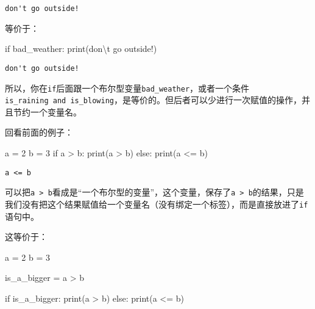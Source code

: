 \documentclass[
  letterpaper,
  DIV=11,
  numbers=noendperiod]{scrreprt}
\newenvironment{Shaded}{\begin{snugshade}}{\end{snugshade}}
\newcommand{\BuiltInTok}[1]{\textcolor[rgb]{0.00,0.23,0.31}{#1}}
\newcommand{\CharTok}[1]{\textcolor[rgb]{0.13,0.47,0.30}{#1}}
\newcommand{\ControlFlowTok}[1]{\textcolor[rgb]{0.00,0.23,0.31}{#1}}
\newcommand{\DecValTok}[1]{\textcolor[rgb]{0.68,0.00,0.00}{#1}}
\newcommand{\NormalTok}[1]{\textcolor[rgb]{0.00,0.23,0.31}{#1}}
\newcommand{\OperatorTok}[1]{\textcolor[rgb]{0.37,0.37,0.37}{#1}}
\newcommand{\StringTok}[1]{\textcolor[rgb]{0.13,0.47,0.30}{#1}}
\begin{document}
\begin{verbatim}
don't go outside!
\end{verbatim}

等价于：

\begin{Shaded}
\begin{Highlighting}[]
\ControlFlowTok{if}\NormalTok{ bad\_weather:}
    \BuiltInTok{print}\NormalTok{(}\StringTok{\textquotesingle{}don}\CharTok{\textbackslash{}\textquotesingle{}}\StringTok{t go outside!\textquotesingle{}}\NormalTok{)}
\end{Highlighting}
\end{Shaded}

\begin{verbatim}
don't go outside!
\end{verbatim}

所以，你在\texttt{if}后面跟一个布尔型变量\texttt{bad\_weather}，或者一个条件\texttt{is\_raining\ and\ is\_blowing}，是等价的。但后者可以少进行一次赋值的操作，并且节约一个变量名。

回看前面的例子：

\begin{Shaded}
\begin{Highlighting}[]
\NormalTok{a }\OperatorTok{=} \DecValTok{2}
\NormalTok{b }\OperatorTok{=} \DecValTok{3}
\ControlFlowTok{if}\NormalTok{ a }\OperatorTok{\textgreater{}}\NormalTok{ b: }
    \BuiltInTok{print}\NormalTok{(}\StringTok{\textquotesingle{}a \textgreater{} b\textquotesingle{}}\NormalTok{)}
\ControlFlowTok{else}\NormalTok{:}
    \BuiltInTok{print}\NormalTok{(}\StringTok{\textquotesingle{}a \textless{}= b\textquotesingle{}}\NormalTok{)}
\end{Highlighting}
\end{Shaded}

\begin{verbatim}
a <= b
\end{verbatim}

可以把\texttt{a\ \textgreater{}\ b}看成是``一个布尔型的变量''，这个变量，保存了\texttt{a\ \textgreater{}\ b}的结果，只是我们没有把这个结果赋值给一个变量名（没有绑定一个标签），而是直接放进了\texttt{if}语句中。

这等价于：

\begin{Shaded}
\begin{Highlighting}[]
\NormalTok{a }\OperatorTok{=} \DecValTok{2}
\NormalTok{b }\OperatorTok{=} \DecValTok{3}

\NormalTok{is\_a\_bigger }\OperatorTok{=}\NormalTok{ a }\OperatorTok{\textgreater{}}\NormalTok{ b }

\ControlFlowTok{if}\NormalTok{ is\_a\_bigger: }
    \BuiltInTok{print}\NormalTok{(}\StringTok{\textquotesingle{}a \textgreater{} b\textquotesingle{}}\NormalTok{)}
\ControlFlowTok{else}\NormalTok{:}
    \BuiltInTok{print}\NormalTok{(}\StringTok{\textquotesingle{}a \textless{}= b\textquotesingle{}}\NormalTok{)}
\end{Highlighting}
\end{Shaded}
\end{document}
